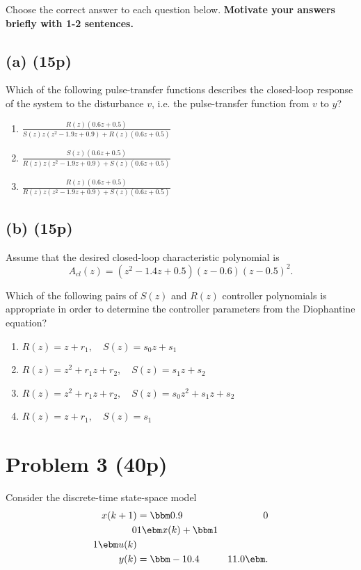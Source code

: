 \documentclass{scrartcl}
\begin{document}
Choose the correct answer to each question below. \textbf{Motivate your answers briefly with 1-2 sentences.}

\subsection*{(a) (15p)}
\label{sec:orgheadline4}
Which of the following pulse-transfer functions describes the closed-loop response of the system to the disturbance \(v\), i.e. the pulse-transfer function from \(v\) to \(y\)?  
\begin{enumerate}
\item \(\frac{R(z) \left(0.6 z + 0.5\right)}{S(z) z \left(z^{2} - 1.9 z + 0.9\right) + R(z) \left(0.6 z + 0.5\right)}\)
\item \(\frac{S(z) \left(0.6 z + 0.5\right)}{R(z) z \left(z^{2} - 1.9 z + 0.9\right) + S(z) \left(0.6 z + 0.5\right)}\)
\item \(\frac{R(z) \left(0.6 z + 0.5\right)}{R(z) z \left(z^{2} - 1.9 z + 0.9\right) + S(z) \left(0.6 z + 0.5\right)}\)
\end{enumerate}
\subsection*{(b) (15p)}
\label{sec:orgheadline5}
Assume that the desired closed-loop characteristic polynomial is
\[ A_{cl}(z) = (z^2 - 1.4z + 0.5)(z-0.6)(z-0.5)^2. \]

Which of the following pairs of \(S(z)\) and \(R(z)\) controller polynomials is appropriate in order to determine the controller parameters from the Diophantine equation?
\begin{enumerate}
\item \(R(z) = z + r_1, \quad S(z) = s_0z + s_1\)
\item \(R(z) = z^2 + r_1z + r_2, \quad S(z) = s_1z + s_2\)
\item \(R(z) = z^2 + r_1z + r_2, \quad S(z) = s_0z^2 + s_1z + s_2\)
\item \(R(z) = z + r_1, \quad S(z) = s_1\)
\end{enumerate}


\section*{Problem 3 (40p)}
\label{sec:orgheadline10}
Consider the discrete-time state-space model
 \begin{equation*}
 \begin{split}
  x(k+1) &= \bbm 0.9 & 0\\0 & 1\ebm x(k) + \bbm 1\\1 \ebm u(k)\\
  y(k) &= \bbm -10.4 & 11.0 \ebm.
 \end{split}
\end{equation*}
\end{document}
